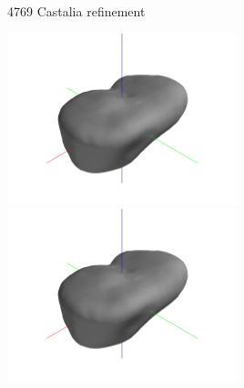 \begin{frame}{4769 Castalia refinement}

\begin{center}
    \href{https://youtu.be/pS8vLuRZGxE}{\includegraphics[trim={20cm 10cm 20cm 10cm},clip,keepaspectratio,width=0.5\textwidth,height=\textheight]{figures/computational_geometry/dynamic_exploration/castalia/partial_14998.jpg}}%
    \href{https://youtu.be/5ETsFOXQeOs}{\includegraphics[trim={20cm 10cm 20cm 10cm},clip,keepaspectratio,width=0.5\textwidth,height=\textheight]{figures/computational_geometry/dynamic_exploration/castalia/partial_14998.jpg}}
\end{center}

\end{frame}

